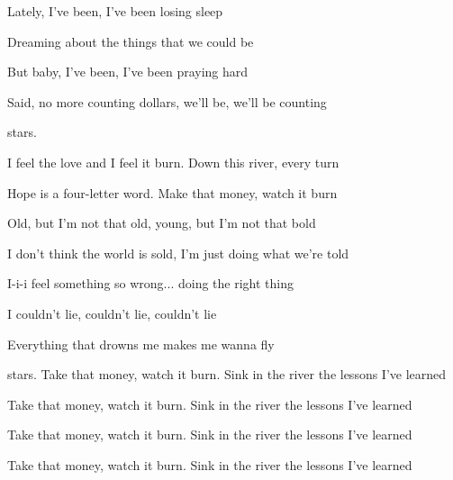 \begin{song}
\begin{chorusbox}{\Chorus}
\bigskip

Lately, I've been, I've been losing sleep \par
{} Dreaming about the things that we could be \par
But baby, I've been, I've been praying hard \par
{} Said, no more counting dollars, we'll be, we'll be counting \par
\end{chorusbox}

\bigskip

stars.    \par

\bigskip

I feel the love and I feel it burn. Down this river, every turn \par
{}Hope is a four-letter word. Make that money, watch it burn \par
{}Old, but I'm not that old, young, but I'm not that bold \par
{}I don't think the world is sold, I'm just doing what we're told \par

\bigskip

 I-i-i feel something so wrong... doing the right thing \par
{} I couldn't lie, couldn't lie, couldn't lie \par
{}Everything that drowns me makes me wanna fly \par

\bigskip

\Chorus

\bigskip





stars. Take that money, watch it burn. Sink in the river the lessons I've learned \par
{}Take that money, watch it burn. Sink in the river the lessons I've learned \par
{}Take that money, watch it burn. Sink in the river the lessons I've learned \par
{}Take that money, watch it burn. Sink in the river the lessons I've learned \par

\end{song}

